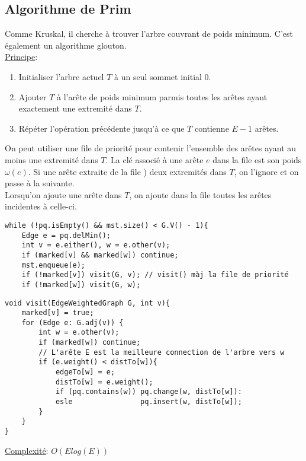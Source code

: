 \documentclass[10pt]{article}
\begin{document}
\subsection{Algorithme de Prim}
Comme Kruskal, il cherche à trouver l'arbre couvrant de poids minimum. C'est également un algorithme glouton.
\\\underline{Principe}:
\begin{enumerate}
\item Initialiser l'arbre actuel $T$ à un seul sommet initial 0.
\item Ajouter $T$ à l'arête de poids minimum parmis toutes les arêtes ayant exactement une extremité dans $T$.
\item Répéter l'opération précédente jusqu'à ce que $T$ contienne  $E - 1$ arêtes.
\end{enumerate}
On peut utiliser une file de priorité pour contenir l'ensemble des arêtes ayant au moins une extremité dans $T$.  La clé associé à une arête $e$ dans la file est son poids $\omega(e)$. Si une arête extraite de la file ) deux extremités dans $T$, on l'ignore et on passe à la suivante. 
\\Lorsqu'on ajoute une arête dans $T$, on ajoute dans la file toutes les arêtes incidentes à celle-ci.
\begin{verbatim}
while (!pq.isEmpty() && mst.size() < G.V() - 1){
	Edge e = pq.delMin();
	int v = e.either(), w = e.other(v);
	if (marked[v] && marked[w]) continue;
	mst.enqueue(e);
	if (!marked[v]) visit(G, v); // visit() màj la file de priorité
	if (!marked[w]) visit(G, w);
\end{verbatim}


\begin{verbatim}
void visit(EdgeWeightedGraph G, int v){
	marked[v] = true;
	for (Edge e: G.adj(v)) {
		int w = e.other(v);
		if (marked[w]) continue;
		// L'arête E est la meilleure connection de l'arbre vers w
		if (e.weight() < distTo[w]){ 
			edgeTo[w] = e;
			distTo[w] = e.weight();
			if (pq.contains(w)) pq.change(w, distTo[w]):
			esle				pq.insert(w, distTo[w]);				
		}
	}
}
\end{verbatim}

\underline{Complexité}: $O(Elog(E))$
\end{document}
